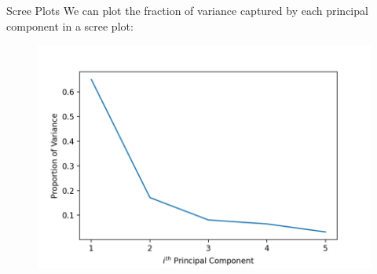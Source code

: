 \documentclass[aspectratio=169]{../latex_main/tntbeamer}  %
\begin{document}
	
	\begin{frame}{Scree Plots}
	    We can plot the fraction of variance captured by each principal component in a scree plot:
	    \begin{figure}
	        \centering
	        \includegraphics[scale=.5]{Bild13}
	    \end{figure}
	\end{frame}
	
\end{document}
